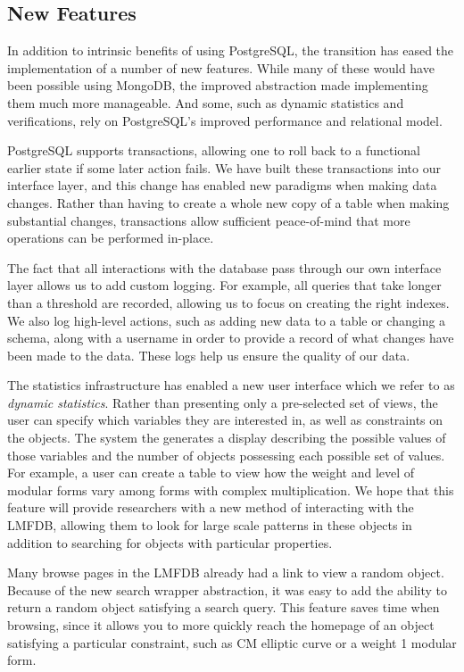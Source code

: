\documentclass{article}
\begin{document}
\subsection{New Features}

In addition to intrinsic benefits of using PostgreSQL, the transition has eased the implementation of a number of new features.
While many of these would have been possible using MongoDB, the improved abstraction made implementing them much more manageable.
And some, such as dynamic statistics and verifications, rely on PostgreSQL's improved performance and relational model.

PostgreSQL supports transactions, allowing one to roll back to a functional earlier state if some later action fails.
We have built these transactions into our interface layer, and this change has enabled new paradigms when making data changes.
Rather than having to create a whole new copy of a table when making substantial changes, transactions allow sufficient peace-of-mind that more operations can be performed in-place.

The fact that all interactions with the database pass through our own interface layer allows us to add custom logging.
For example, all queries that take longer than a threshold are recorded, allowing us to focus on creating the right indexes.
We also log high-level actions, such as adding new data to a table or changing a schema, along with a username in order to provide a record of what changes have been made to the data.
These logs help us ensure the quality of our data.

The statistics infrastructure has enabled a new user interface which we refer to as \emph{dynamic statistics}.
Rather than presenting only a pre-selected set of views, the user can specify which variables they are interested in, as well as constraints on the objects.
The system the generates a display describing the possible values of those variables and the number of objects possessing each possible set of values.
For example, a user can create a table to view how the weight and level of modular forms vary among forms with complex multiplication.
We hope that this feature will provide researchers with a new method of interacting with the LMFDB, allowing them to look for large scale patterns in these objects in addition to searching for objects with particular properties.

Many browse pages in the LMFDB already had a link to view a random object.
Because of the new search wrapper abstraction, it was easy to add the ability to return a random object satisfying a search query.
This feature saves time when browsing, since it allows you to more quickly reach the homepage of an object satisfying a particular constraint, such as CM elliptic curve or a weight 1 modular form.
\end{document}
